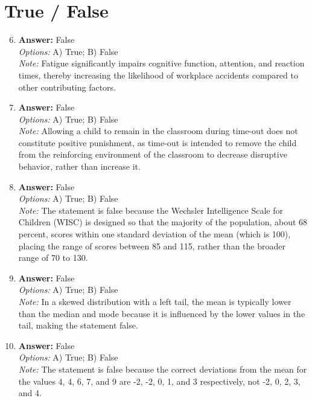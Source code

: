 \documentclass[12pt]{article}
\begin{document}
\section*{True / False}
\begin{enumerate}[label=\arabic*.]
\setcounter{enumi}{5}
\item \textbf{Answer:} False
\\ \textit{Options:} A) True; B) False
\\ \textit{Note:} Fatigue significantly impairs cognitive function, attention, and reaction times, thereby increasing the likelihood of workplace accidents compared to other contributing factors.
\item \textbf{Answer:} False
\\ \textit{Options:} A) True; B) False
\\ \textit{Note:} Allowing a child to remain in the classroom during time-out does not constitute positive punishment, as time-out is intended to remove the child from the reinforcing environment of the classroom to decrease disruptive behavior, rather than increase it.
\item \textbf{Answer:} False
\\ \textit{Options:} A) True; B) False
\\ \textit{Note:} The statement is false because the Wechsler Intelligence Scale for Children (WISC) is designed so that the majority of the population, about 68 percent, scores within one standard deviation of the mean (which is 100), placing the range of scores between 85 and 115, rather than the broader range of 70 to 130.
\item \textbf{Answer:} False
\\ \textit{Options:} A) True; B) False
\\ \textit{Note:} In a skewed distribution with a left tail, the mean is typically lower than the median and mode because it is influenced by the lower values in the tail, making the statement false.
\item \textbf{Answer:} False
\\ \textit{Options:} A) True; B) False
\\ \textit{Note:} The statement is false because the correct deviations from the mean for the values 4, 4, 6, 7, and 9 are -2, -2, 0, 1, and 3 respectively, not -2, 0, 2, 3, and 4.
\end{enumerate}
\end{document}
